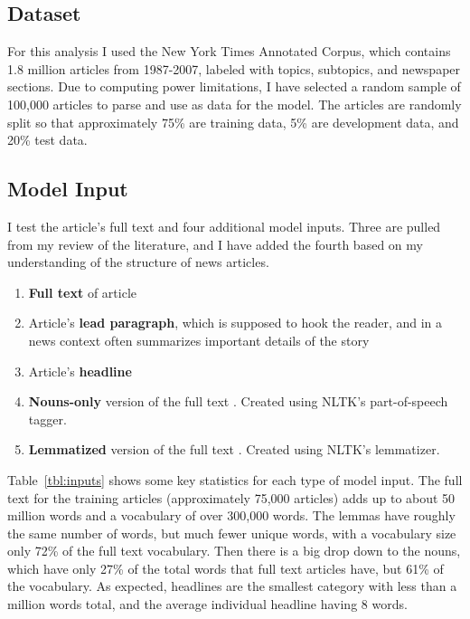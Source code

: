 \documentclass[11pt,a4paper,table]{article}
\begin{document}
\subsection{Dataset}
\label{ssec:dataset}

For this analysis I used the New York Times Annotated Corpus, which contains 1.8 million articles from 1987-2007, labeled with topics, subtopics, and newspaper sections. Due to computing power limitations, I have selected a random sample of 100,000 articles to parse and use as data for the model. The articles are randomly split so that approximately 75\% are training data, 5\% are development data, and 20\% test data.

\subsection{Model Input}
\label{ssec:input}

I test the article's full text and four additional model inputs. Three are pulled from my review of the literature,  and I have added the fourth based on my understanding of the structure of news articles.

\begin{enumerate}
\item \textbf{Full text} of article
\item Article's \textbf{lead paragraph}, which is supposed to hook the reader, and in a news context often summarizes important details of the story \cite{NPR}
\item Article's \textbf{headline} \cite{Wermter:02}
\item \textbf{Nouns-only} version of the full text \cite{Martin:15}. Created using NLTK's part-of-speech tagger.
\item \textbf{Lemmatized} version of the full text \cite{Martin:15}. Created using NLTK's lemmatizer.
\end{enumerate}

Table~\ref{tbl:inputs} shows some key statistics for each type of model input. The full text for the training articles (approximately 75,000 articles) adds up to about 50 million words and a vocabulary of over 300,000 words. The lemmas have roughly the same number of words, but much fewer unique words, with a vocabulary size only 72\% of the full text vocabulary. Then there is a big drop down to the nouns, which have only 27\% of the total words that full text articles have, but 61\% of the vocabulary. As expected, headlines are the smallest category with less than a million words total, and the average individual headline having 8 words.
\end{document}
